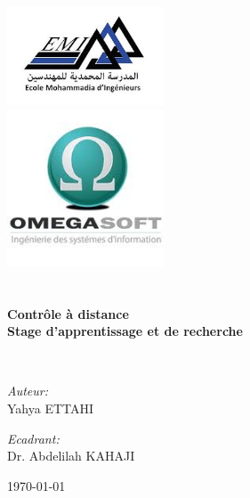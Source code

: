 \begin{titlepage}
\begin{center}


\includegraphics[width=0.35\textwidth]{./logo}~\\[1cm]
\includegraphics[width=0.35\textwidth]{./omega}~\\[1cm]



\textsc{\Large }\\[0.5cm]

\HRule \\[0.4cm]

{\huge \bfseries Contrôle à distance\\
Stage d'apprentissage et de recherche  \\[0.4cm] }

\HRule \\[1.5cm]

\begin{minipage}{0.4\textwidth}
\begin{flushleft} \large
\emph{Auteur:}\\
Yahya \textsc{ETTAHI}\\
\end{flushleft}
\end{minipage}
\begin{minipage}{0.4\textwidth}
\begin{flushright} \large
\emph{Ecadrant:} \\
Dr. Abdelilah \textsc{KAHAJI}\\
\end{flushright}
\end{minipage}

\vfill

{\large \today}

\end{center}
\end{titlepage}